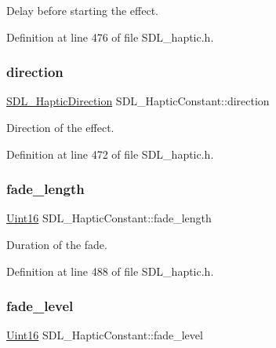 Delay before starting the effect. 

Definition at line 476 of file S\+D\+L\+\_\+haptic.\+h.

\mbox{\label{struct_s_d_l___haptic_constant_a3e871debf4e57c35960f019d2605d84f}} 
\subsubsection{\texorpdfstring{direction}{direction}}
{\footnotesize\ttfamily \mbox{\hyperlink{struct_s_d_l___haptic_direction}{S\+D\+L\+\_\+\+Haptic\+Direction}} S\+D\+L\+\_\+\+Haptic\+Constant\+::direction}

Direction of the effect. 

Definition at line 472 of file S\+D\+L\+\_\+haptic.\+h.

\mbox{\label{struct_s_d_l___haptic_constant_a647a6b761ac6ba16160d0892a12806bc}} 
\subsubsection{\texorpdfstring{fade\_length}{fade\_length}}
{\footnotesize\ttfamily \mbox{\hyperlink{_s_d_l__stdinc_8h_a31fcc0a076c9068668173ee26d33e42b}{Uint16}} S\+D\+L\+\_\+\+Haptic\+Constant\+::fade\+\_\+length}

Duration of the fade. 

Definition at line 488 of file S\+D\+L\+\_\+haptic.\+h.

\mbox{\label{struct_s_d_l___haptic_constant_a49f6499c89f3e494efbe92f12277c949}} 
\subsubsection{\texorpdfstring{fade\_level}{fade\_level}}
{\footnotesize\ttfamily \mbox{\hyperlink{_s_d_l__stdinc_8h_a31fcc0a076c9068668173ee26d33e42b}{Uint16}} S\+D\+L\+\_\+\+Haptic\+Constant\+::fade\+\_\+level}

